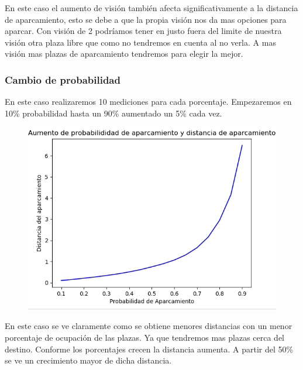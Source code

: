\documentclass[]{article}
\begin{document}
En este caso el aumento de visión también afecta significativamente a la distancia de aparcamiento, esto se debe a que la propia visión nos da mas opciones para aparcar. Con visión de 2 podríamos tener en justo fuera del limite de nuestra visión otra plaza libre que como no tendremos en cuenta al no verla. A mas visión mas plazas de aparcamiento tendremos para elegir la mejor.





\subsubsection{Cambio de probabilidad}

En este caso realizaremos 10 mediciones para cada porcentaje. Empezaremos en 10\% probabilidad hasta un 90\% aumentado un 5\% cada vez.

\begin{figure}[H]
	\centering
	\includegraphics[width=1\linewidth]{img/screenshot014}
	\label{fig:screenshot014}
\end{figure}

En este caso se ve claramente como se obtiene menores distancias con un menor porcentaje de ocupación de las plazas. Ya que tendremos mas plazas cerca del destino. Conforme los porcentajes crecen la distancia aumenta. A partir del 50\% se ve un crecimiento mayor de dicha distancia. 
\end{document}
